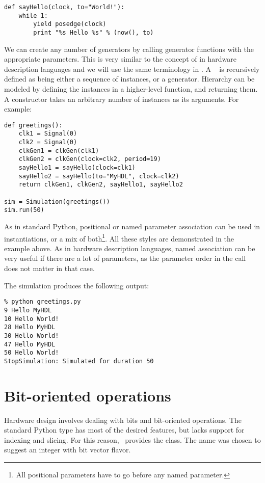 \begin{verbatim}
def sayHello(clock, to="World!"):
    while 1:
        yield posedge(clock)
        print "%s Hello %s" % (now(), to)
\end{verbatim}

We can create any number of generators by calling generator functions
with the appropriate parameters. This is very similar to the concept
of  in hardware description languages and we will use
the same terminology in \myhdl{}. A \myhdl\  is
recursively defined as being either a sequence of instances, or a
generator.  Hierarchy can be modeled by defining the instances in a
higher-level function, and returning them. 
A  constructor takes an arbitrary number of
instances as its arguments.
For example:

\begin{verbatim}
def greetings():
    clk1 = Signal(0)
    clk2 = Signal(0)
    clkGen1 = clkGen(clk1)
    clkGen2 = clkGen(clock=clk2, period=19)
    sayHello1 = sayHello(clock=clk1)
    sayHello2 = sayHello(to="MyHDL", clock=clk2)
    return clkGen1, clkGen2, sayHello1, sayHello2

sim = Simulation(greetings())
sim.run(50)
\end{verbatim}

As in standard Python, positional or named parameter association can
be used in instantiations, or a mix of both\footnote{All positional
parameters have to go before any named parameter.}. All these styles
are demonstrated in the example above. As in hardware description
languages, named association can be very useful if there are a lot of
parameters, as the parameter order in the call does not matter in that
case.

The simulation produces the following output:

\begin{verbatim}
% python greetings.py
9 Hello MyHDL
10 Hello World!
28 Hello MyHDL
30 Hello World!
47 Hello MyHDL
50 Hello World!
StopSimulation: Simulated for duration 50
\end{verbatim}


\section{Bit-oriented operations \label{intro-bit}}

Hardware design involves dealing with bits and bit-oriented
operations. The standard Python type  has most of the
desired features, but lacks support for indexing and slicing. For this
reason, \myhdl\ provides the  class. The name was chosen
to suggest an integer with bit vector flavor.

